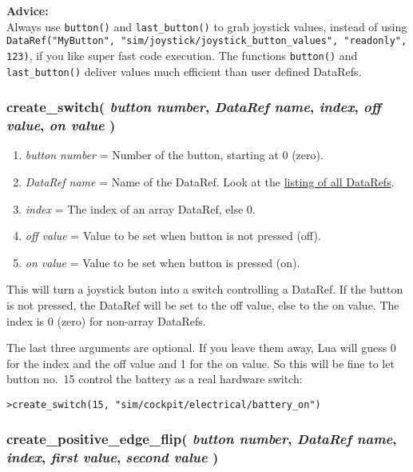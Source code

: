 \documentclass[11pt,parskip=half,a4paper]{scrartcl}
\begin{document}
\textbf{Advice:}\\
Always use \verb|button()| and \verb|last_button()| to grab joystick values, instead of using\\ \verb|DataRef("MyButton", "sim/joystick/joystick_button_values", "readonly", 123)|, if you like super fast code execution. The functions \verb|button()| and \verb|last_button()| deliver values much efficient than user defined DataRefs.

\subsubsection{create\_switch( \emph{button number}, \emph{DataRef name}, \emph{index}, \emph{off value}, \emph{on value} )}

\begin{enumerate}
	\item \emph{button number} = Number of the button, starting at 0 (zero).
	\item \emph{DataRef name} = Name of the DataRef. Look at the \href{http://www.xsquawkbox.net/xpsdk/docs/DataRefs.html}{listing of all DataRefs}.
	\item \emph{index} = The index of an array DataRef, else 0.
	\item \emph{off value} = Value to be set when button is not pressed (off).
	\item \emph{on value} = Value to be set when button is pressed (on).
\end{enumerate}

This will turn a joystick buton into a switch controlling a DataRef. If the button is not pressed, the DataRef will be set to the off value, else to the on value. The index is 0 (zero) for non-array DataRefs.

The last three arguments are optional. If you leave them away, Lua will guess 0 for the index and the off value and 1 for the on value. So this will be fine to let button no.~15 control the battery as a real hardware switch:

\verb|>create_switch(15, "sim/cockpit/electrical/battery_on")|

\subsubsection{create\_positive\_edge\_flip( \emph{button number}, \emph{DataRef name}, \emph{index}, \emph{first value}, \emph{second value} )}
\end{document}
